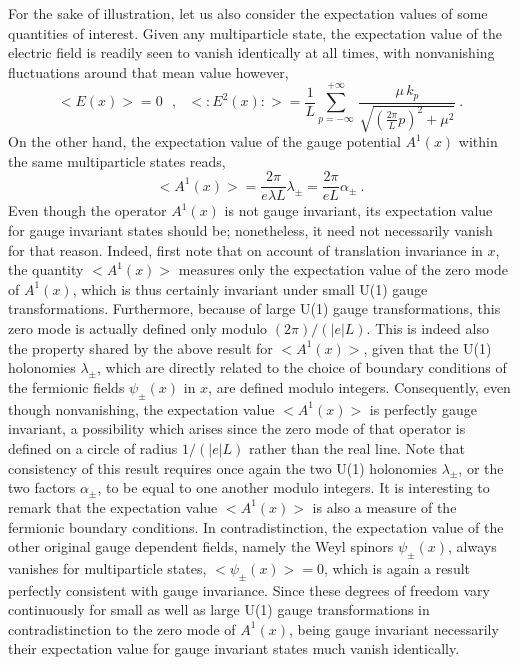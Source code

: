 \documentclass[a4paper,11pt]{article}
\begin{document}
For the sake of illustration, let us also consider the expectation values 
of some quantities of interest. Given any multiparticle state, the
expectation value of the electric field is readily seen to vanish
identically at all times, with nonvanishing fluctuations around that 
mean value however,
\begin{equation}
<E(x)>=0\ \ \ ,\ \ \
<:E^2(x):>=\frac{1}{L}\sum_{p=-\infty}^{+\infty}\,
\frac{\mu\,k_p}{\sqrt{(\frac{2\pi}{L}p)^2+\mu^2}}\ .
\end{equation}
On the other hand, the expectation value of the gauge potential $A^1(x)$
within the same multiparticle states reads,
\begin{equation}
<A^1(x)>=\frac{2\pi}{e\lambda L}\lambda_\pm=\frac{2\pi}{eL}\alpha_\pm\ .
\end{equation}
Even though the operator $A^1(x)$ is not gauge invariant, its expectation
value for gauge invariant states should be; nonetheless, it need not 
necessarily vanish for that reason. Indeed, first note that on account of 
translation invariance in $x$, the quantity $<A^1(x)>$ measures only the 
expectation value of the zero mode of $A^1(x)$, which is thus certainly 
invariant under small U(1) gauge transformations. Furthermore, because of large
U(1) gauge transformations, this zero mode is actually defined only modulo
$(2\pi)/(|e|L)$. This is indeed also the property shared by the above
result for $<A^1(x)>$, given that the U(1) holonomies $\lambda_\pm$, 
which are directly related to the choice of boundary conditions of the 
fermionic fields $\psi_\pm(x)$ in $x$, are defined modulo integers. 
Consequently, even though nonvanishing, the expectation value $<A^1(x)>$
is perfectly gauge invariant, a possibility which arises since the
zero mode of that operator is defined on a circle of radius $1/(|e|L)$
rather than the real line. Note that consistency of this result requires once 
again the two U(1) holonomies $\lambda_\pm$, or the two factors $\alpha_\pm$,
to be equal to one another modulo integers. It is interesting to remark that 
the expectation value $<A^1(x)>$ is also a measure of the fermionic boundary 
conditions. In contradistinction, the expectation value of the other original 
gauge dependent fields, namely the Weyl spinors $\psi_\pm(x)$, always vanishes
for multiparticle states, $<\psi_\pm(x)>=0$, which is again a result
perfectly consistent with gauge invariance. Since these degrees of 
freedom vary continuously for small as well as large U(1) gauge 
transformations in contradistinction to the zero mode of $A^1(x)$, being
gauge invariant necessarily their expectation value for gauge invariant 
states much vanish identically.
\end{document}
